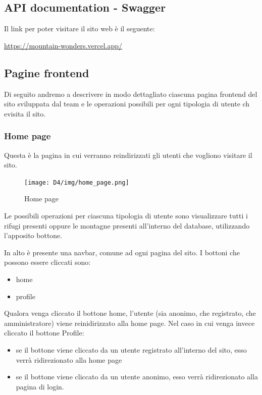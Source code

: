 \documentclass[a4paper,12pt]{article}
\begin{document}
\subsection{API documentation - Swagger}
Il link per poter visitare il sito web è il seguente: 
\newline

\centerline{\url{ https://mountain-wonders.vercel.app/ }}

\subsection{Pagine frontend}
Di seguito andremo a descrivere in modo dettagliato ciascuna pagina frontend del sito sviluppata dal team e le operazioni possibili per ogni tipologia di utente ch evisita il sito.

\subsubsection{Home page}
Questa è la pagina in cui verranno reindirizzati gli utenti che vogliono visitare il sito.
\begin{figure}[H]
    \centering
    \texttt{[image: D4/img/home\_page.png]}
    \caption{Home page}
\end{figure}
Le possibili operazioni per ciascuna tipologia di utente sono visualizzare tutti i rifugi presenti oppure le montagne presenti all'interno del database, utilizzando l'apposito bottone.

In alto è presente una navbar, comune ad ogni pagina del sito.
I bottoni che possono essere cliccati sono:
\begin{itemize}
    \item home
    \item profile
\end{itemize}

Qualora venga cliccato il bottone home, l'utente (sia anonimo, che registrato, che amministratore) viene reinidirizzato alla home page. \newline
Nel caso in cui venga invece cliccato il bottone Profile:
\begin{itemize}
    \item se il bottone viene cliccato da un utente registrato all'interno del sito, esso verrà ridirezionato alla home page
    \item se il bottone viene cliccato da un utente anonimo, esso verrà ridirezionato alla pagina di login.
\end{itemize}
\end{document}
